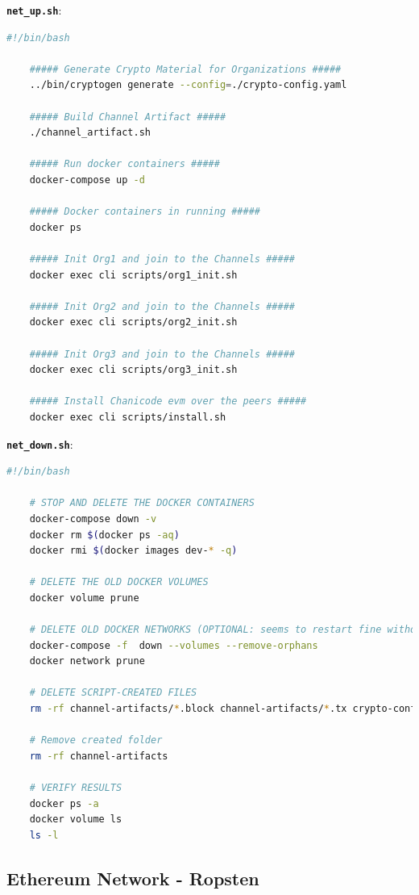 \textbf{\texttt{net\_up.sh}}:

\begin{lstlisting}[language=bash]
    #!/bin/bash

    ##### Generate Crypto Material for Organizations #####
    ../bin/cryptogen generate --config=./crypto-config.yaml

    ##### Build Channel Artifact #####
    ./channel_artifact.sh

    ##### Run docker containers #####
    docker-compose up -d

    ##### Docker containers in running #####
    docker ps

    ##### Init Org1 and join to the Channels #####
    docker exec cli scripts/org1_init.sh

    ##### Init Org2 and join to the Channels #####
    docker exec cli scripts/org2_init.sh

    ##### Init Org3 and join to the Channels #####
    docker exec cli scripts/org3_init.sh

    ##### Install Chanicode evm over the peers #####
    docker exec cli scripts/install.sh
\end{lstlisting}

\bigskip

\textbf{\texttt{net\_down.sh}}:

\begin{lstlisting}[language=bash]
    #!/bin/bash

    # STOP AND DELETE THE DOCKER CONTAINERS
    docker-compose down -v
    docker rm $(docker ps -aq)
    docker rmi $(docker images dev-* -q)

    # DELETE THE OLD DOCKER VOLUMES
    docker volume prune

    # DELETE OLD DOCKER NETWORKS (OPTIONAL: seems to restart fine without)
    docker-compose -f  down --volumes --remove-orphans
    docker network prune

    # DELETE SCRIPT-CREATED FILES
    rm -rf channel-artifacts/*.block channel-artifacts/*.tx crypto-config

    # Remove created folder
    rm -rf channel-artifacts

    # VERIFY RESULTS
    docker ps -a
    docker volume ls
    ls -l
\end{lstlisting}

\subsection{Ethereum Network - Ropsten}

